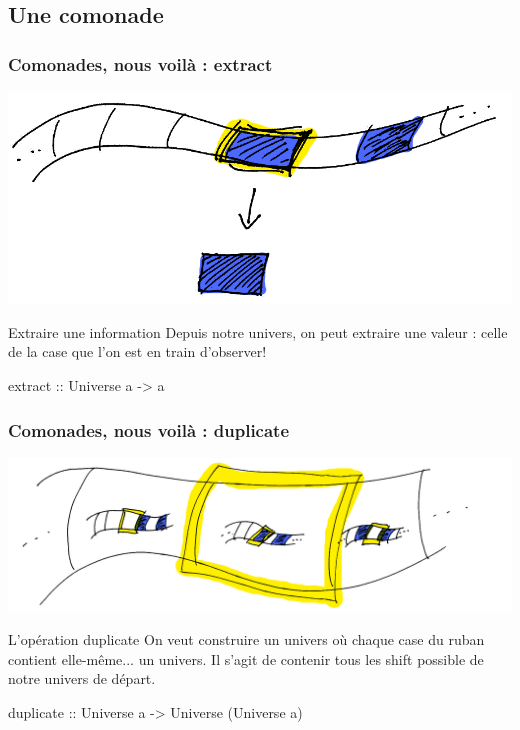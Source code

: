 \documentclass{beamer}
\begin{document}
\subsection{Une comonade}
\begin{frame}
\frametitle{Comonades, nous voilà : extract}

\begin{center}
\includegraphics[scale=0.3]{ribbon_extract.png}
\end{center}
\begin{block}{Extraire une information}
Depuis notre univers, on peut extraire une valeur : celle de la case que l'on est en train d'observer!

\end{block}
\begin{block}{}
extract :: Universe a -> a
\end{block}
\end{frame}

\begin{frame}
\frametitle{Comonades, nous voilà : duplicate}
\begin{center}
\includegraphics[scale=0.15]{ribbon_duplicate.png}
\end{center}

\begin{block}{L'opération duplicate}
On veut construire un univers où chaque case du ruban contient elle-même... un univers. Il s'agit de contenir tous les shift possible de notre univers de départ.
\end{block}

\begin{block}{}
duplicate :: Universe a -> Universe (Universe a)
\end{block}
\end{frame}
\end{document}
